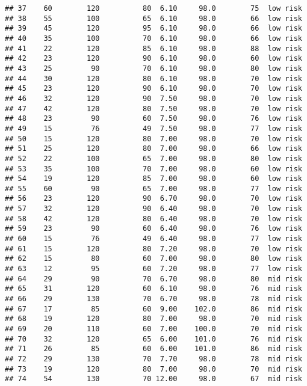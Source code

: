 \documentclass[
  ignorenonframetext,
]{beamer}
\begin{document}
\begin{frame}[fragile]
\begin{verbatim}
## 37    60        120          80  6.10     98.0        75  low risk
## 38    55        100          65  6.10     98.0        66  low risk
## 39    45        120          95  6.10     98.0        66  low risk
## 40    35        100          70  6.10     98.0        66  low risk
## 41    22        120          85  6.10     98.0        88  low risk
## 42    23        120          90  6.10     98.0        60  low risk
## 43    25         90          70  6.10     98.0        80  low risk
## 44    30        120          80  6.10     98.0        70  low risk
## 45    23        120          90  6.10     98.0        70  low risk
## 46    32        120          90  7.50     98.0        70  low risk
## 47    42        120          80  7.50     98.0        70  low risk
## 48    23         90          60  7.50     98.0        76  low risk
## 49    15         76          49  7.50     98.0        77  low risk
## 50    15        120          80  7.00     98.0        70  low risk
## 51    25        120          80  7.00     98.0        66  low risk
## 52    22        100          65  7.00     98.0        80  low risk
## 53    35        100          70  7.00     98.0        60  low risk
## 54    19        120          85  7.00     98.0        60  low risk
## 55    60         90          65  7.00     98.0        77  low risk
## 56    23        120          90  6.70     98.0        70  low risk
## 57    32        120          90  6.40     98.0        70  low risk
## 58    42        120          80  6.40     98.0        70  low risk
## 59    23         90          60  6.40     98.0        76  low risk
## 60    15         76          49  6.40     98.0        77  low risk
## 61    15        120          80  7.20     98.0        70  low risk
## 62    15         80          60  7.00     98.0        80  low risk
## 63    12         95          60  7.20     98.0        77  low risk
## 64    29         90          70  6.70     98.0        80  mid risk
## 65    31        120          60  6.10     98.0        76  mid risk
## 66    29        130          70  6.70     98.0        78  mid risk
## 67    17         85          60  9.00    102.0        86  mid risk
## 68    19        120          80  7.00     98.0        70  mid risk
## 69    20        110          60  7.00    100.0        70  mid risk
## 70    32        120          65  6.00    101.0        76  mid risk
## 71    26         85          60  6.00    101.0        86  mid risk
## 72    29        130          70  7.70     98.0        78  mid risk
## 73    19        120          80  7.00     98.0        70  mid risk
## 74    54        130          70 12.00     98.0        67  mid risk

\end{verbatim}
\end{frame}
\end{document}
